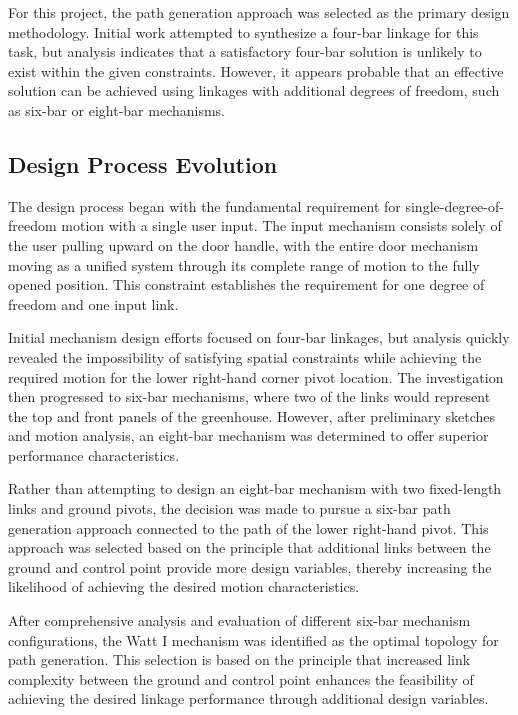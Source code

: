 \documentclass[12pt]{article}
\begin{document}
For this project, the path generation approach was selected as the primary design methodology. Initial work attempted to synthesize a four-bar linkage for this task, but analysis indicates that a satisfactory four-bar solution is unlikely to exist within the given constraints. However, it appears probable that an effective solution can be achieved using linkages with additional degrees of freedom, such as six-bar or eight-bar mechanisms.

\subsection{Design Process Evolution}
\label{sec:design_evolution}

The design process began with the fundamental requirement for single-degree-of-freedom motion with a single user input. The input mechanism consists solely of the user pulling upward on the door handle, with the entire door mechanism moving as a unified system through its complete range of motion to the fully opened position. This constraint establishes the requirement for one degree of freedom and one input link.

Initial mechanism design efforts focused on four-bar linkages, but analysis quickly revealed the impossibility of satisfying spatial constraints while achieving the required motion for the lower right-hand corner pivot location. The investigation then progressed to six-bar mechanisms, where two of the links would represent the top and front panels of the greenhouse. However, after preliminary sketches and motion analysis, an eight-bar mechanism was determined to offer superior performance characteristics.

Rather than attempting to design an eight-bar mechanism with two fixed-length links and ground pivots, the decision was made to pursue a six-bar path generation approach connected to the path of the lower right-hand pivot. This approach was selected based on the principle that additional links between the ground and control point provide more design variables, thereby increasing the likelihood of achieving the desired motion characteristics.

After comprehensive analysis and evaluation of different six-bar mechanism configurations, the Watt I mechanism was identified as the optimal topology for path generation. This selection is based on the principle that increased link complexity between the ground and control point enhances the feasibility of achieving the desired linkage performance through additional design variables.
\end{document}
